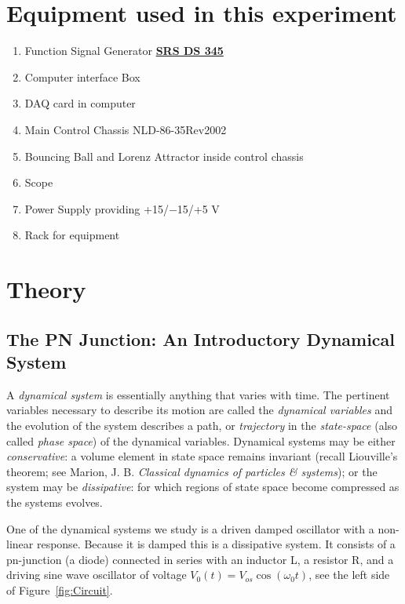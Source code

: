\documentclass{../lab}
\begin{document}
\section{Equipment used in this experiment}

\begin{enumerate}
    \item Function Signal Generator \href{https://youtu.be/PrM8DHFOFS0}{\textbf{SRS DS 345}}

    \item Computer interface Box

    \item DAQ card in computer

    \item Main Control Chassis NLD-86-35Rev2002

    \item Bouncing Ball and Lorenz Attractor inside control chassis

    \item Scope

    \item Power Supply providing +15/$-$15/+5 V

    \item Rack for equipment
\end{enumerate}

\section{Theory}

\subsection{The PN Junction: An Introductory Dynamical System}

A \emph{dynamical system} is essentially anything that varies with time. The pertinent variables necessary to describe its motion are called the \emph{dynamical variables} and the evolution of the system describes a path, or \emph{trajectory} in the \emph{state-space} (also called \emph{phase space}) of the dynamical variables. Dynamical systems may be either \emph{conservative}: a volume element in state space remains invariant (recall Liouville's theorem; see Marion, J. B. \emph{Classical dynamics of particles \& systems}); or the system may be \emph{dissipative}: for which regions of state space become compressed as the systems evolves.

One of the dynamical systems we study is a driven damped oscillator with a non-linear response. Because it is damped this is a dissipative system. It consists of a pn-junction (a diode) connected in series with an inductor L, a resistor R, and a driving sine wave oscillator of voltage $V_0(t) = V_{os} \cos(\omega_0 t) $, see the left side of Figure~\ref{fig:Circuit}.
\end{document}
